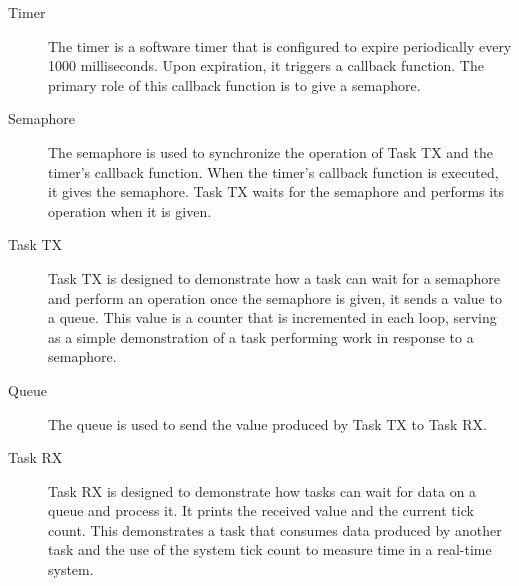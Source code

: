 \begin{description}
    \item[Timer] The timer is a software timer that is configured to expire periodically every 1000 milliseconds. Upon expiration, it triggers a callback function. The primary role of this callback function is to give a semaphore.
    \item[Semaphore] The semaphore is used to synchronize the operation of Task TX and the timer's callback function. When the timer's callback function is executed, it gives the semaphore. Task TX waits for the semaphore and performs its operation when it is given.
    \item[Task TX] Task TX is designed to demonstrate how a task can wait for a semaphore and perform an operation once the semaphore is given, it sends a value to a queue. This value is a counter that is incremented in each loop, serving as a simple demonstration of a task performing work in response to a semaphore.
    \item[Queue] The queue is used to send the value produced by Task TX to Task RX.
    \item[Task RX] Task RX is designed to demonstrate how tasks can wait for data on a queue and process it. It prints the received value and the current tick count. This demonstrates a task that consumes data produced by another task and the use of the system tick count to measure time in a real-time system.
\end{description}
